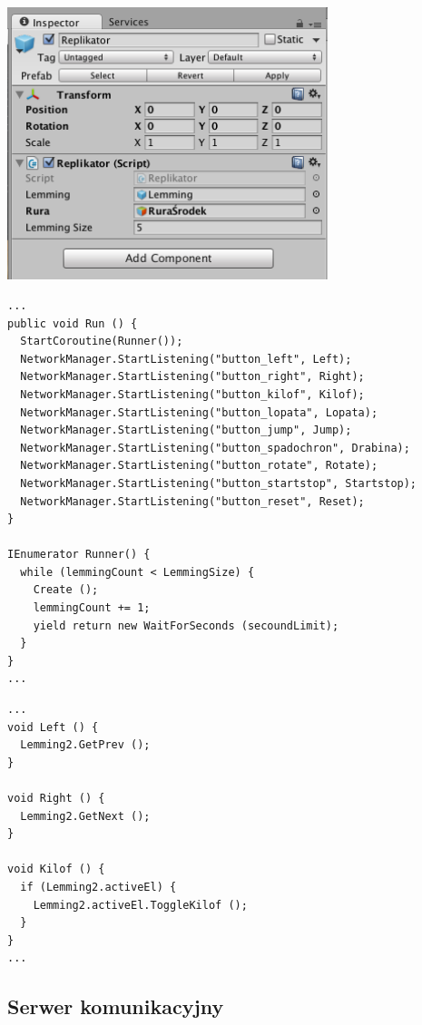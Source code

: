 \begin{center}
\includegraphics[width=0.7\textwidth]{images/replikator.png}
\end{center}

\begin{lstlisting}[language=CSharp]
...
public void Run () {
  StartCoroutine(Runner());
  NetworkManager.StartListening("button_left", Left);
  NetworkManager.StartListening("button_right", Right);
  NetworkManager.StartListening("button_kilof", Kilof);
  NetworkManager.StartListening("button_lopata", Lopata);
  NetworkManager.StartListening("button_jump", Jump);
  NetworkManager.StartListening("button_spadochron", Drabina);
  NetworkManager.StartListening("button_rotate", Rotate);
  NetworkManager.StartListening("button_startstop", Startstop);
  NetworkManager.StartListening("button_reset", Reset);
}

IEnumerator Runner() {
  while (lemmingCount < LemmingSize) {
    Create ();
    lemmingCount += 1;
    yield return new WaitForSeconds (secoundLimit);
  }
}
...
\end{lstlisting}

\begin{lstlisting}[language=CSharp]
...
void Left () {
  Lemming2.GetPrev ();
}

void Right () {
  Lemming2.GetNext ();
}

void Kilof () {
  if (Lemming2.activeEl) {
    Lemming2.activeEl.ToggleKilof ();
  }
}
...
\end{lstlisting}

\subsection{Serwer komunikacyjny}
